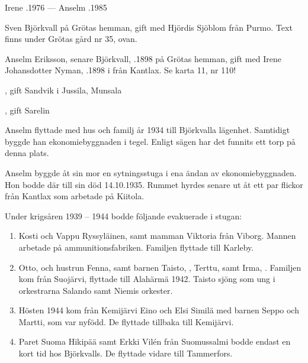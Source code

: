 Irene .1976  ---  Anselm .1985



%


%
Sven Björkvall på Grötas hemman, gift med Hjördis Sjöblom från Purmo. Text finns under Grötas gård nr 35, ovan.\jhvspace{}


%
Anselm Eriksson, senare Björkvall, .1898 på Grötas hemman, gift med Irene Johansdotter Nyman, .1898 i från Kantlax. Se karta 11, nr 110!
\begin{jhchildren}
  \item {}
  \item {}, gift Sandvik i Jussila, Munsala
  \item {}, gift Sarelin
  \item {}
\end{jhchildren}
Anselm flyttade med hus och familj år 1934 till Björkvalla lägenhet. Samtidigt byggde han ekonomiebyggnaden i tegel. Enligt sägen har det funnits ett torp på denna plats.



%

%
Anselm byggde åt sin mor en sytningsstuga i ena ändan av ekonomiebyggnaden. Hon bodde där till sin död 14.10.1935.
Rummet hyrdes senare ut  åt ett par flickor från Kantlax som 	arbetade på Kiitola.

Under krigsåren 1939 – 1944 bodde följande evakuerade i stugan:
\begin{enumerate}
  \item Kosti och Vappu Ryssyläinen, samt mamman Viktoria från Viborg. Mannen arbetade på ammunitionsfabriken. Familjen
	flyttade till Karleby.
  \item Otto,  och hustrun Fenna,  samt barnen Taisto, , Terttu,  samt Irma, . Familjen kom från Suojärvi, flyttade till Alahärmä 1942. Taisto sjöng som ung i orkestrarna Salando samt Niemis orkester.
  \item Hösten 1944 kom från Kemijärvi Eino och Elsi Similä med barnen Seppo och Martti, som var nyfödd. De flyttade tillbaka till Kemijärvi.
  \item Paret Suoma Hikipää samt Erkki Vilén från Suomussalmi bodde endast en kort tid hos Björkvalls. De flyttade vidare till Tammerfors.
\end{enumerate}


